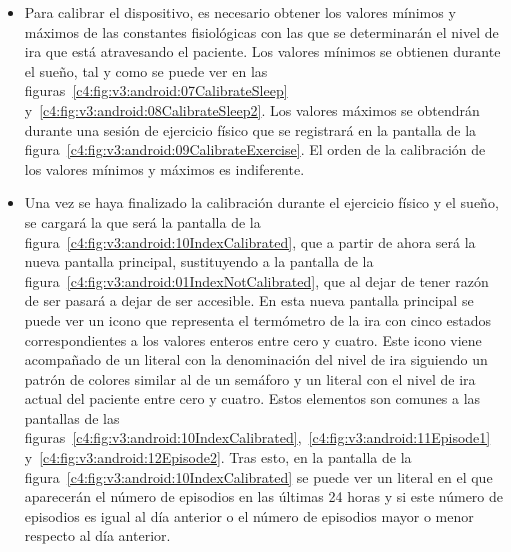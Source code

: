 \begin{itemize}
 \item Para calibrar el dispositivo, es necesario obtener los valores mínimos y máximos de las constantes fisiológicas con las que se determinarán el nivel de ira que está atravesando el paciente. Los valores mínimos se obtienen durante el sueño, tal y como se puede ver en las figuras~\ref{c4:fig:v3:android:07CalibrateSleep} y~\ref{c4:fig:v3:android:08CalibrateSleep2}. Los valores máximos se obtendrán durante una sesión de ejercicio físico que se registrará en la pantalla de la figura~\ref{c4:fig:v3:android:09CalibrateExercise}. El orden de la calibración de los valores mínimos y máximos es indiferente.
   \item Una vez se haya finalizado la calibración durante el ejercicio físico y el sueño, se cargará la que será la pantalla de la figura~\ref{c4:fig:v3:android:10IndexCalibrated}, que a partir de ahora será la nueva pantalla principal, sustituyendo a la pantalla de la figura~\ref{c4:fig:v3:android:01IndexNotCalibrated}, que al dejar de tener razón de ser pasará a dejar de ser accesible. En esta nueva pantalla principal se puede ver un icono que representa el termómetro de la ira con cinco estados correspondientes a los valores enteros entre cero y cuatro. Este icono viene acompañado de un literal con la denominación del nivel de ira siguiendo un patrón de colores similar al de un semáforo y un literal con el nivel de ira actual del paciente entre cero y cuatro. Estos elementos son comunes a las pantallas de las figuras~\ref{c4:fig:v3:android:10IndexCalibrated},~\ref{c4:fig:v3:android:11Episode1} y~\ref{c4:fig:v3:android:12Episode2}. Tras esto, en la pantalla de la figura~\ref{c4:fig:v3:android:10IndexCalibrated} se puede ver un literal en el que aparecerán el número de episodios en las últimas 24 horas y si este número de episodios es igual al día anterior o el número de episodios mayor o menor respecto al día anterior.    


\end{itemize}
